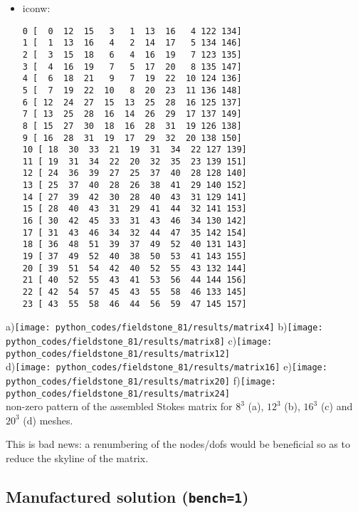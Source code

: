 \begin{itemize}
\item iconw:
\begin{verbatim}
0 [  0  12  15   3   1  13  16   4 122 134]
1 [  1  13  16   4   2  14  17   5 134 146]
2 [  3  15  18   6   4  16  19   7 123 135]
3 [  4  16  19   7   5  17  20   8 135 147]
4 [  6  18  21   9   7  19  22  10 124 136]
5 [  7  19  22  10   8  20  23  11 136 148]
6 [ 12  24  27  15  13  25  28  16 125 137]
7 [ 13  25  28  16  14  26  29  17 137 149]
8 [ 15  27  30  18  16  28  31  19 126 138]
9 [ 16  28  31  19  17  29  32  20 138 150]
10 [ 18  30  33  21  19  31  34  22 127 139]
11 [ 19  31  34  22  20  32  35  23 139 151]
12 [ 24  36  39  27  25  37  40  28 128 140]
13 [ 25  37  40  28  26  38  41  29 140 152]
14 [ 27  39  42  30  28  40  43  31 129 141]
15 [ 28  40  43  31  29  41  44  32 141 153]
16 [ 30  42  45  33  31  43  46  34 130 142]
17 [ 31  43  46  34  32  44  47  35 142 154]
18 [ 36  48  51  39  37  49  52  40 131 143]
19 [ 37  49  52  40  38  50  53  41 143 155]
20 [ 39  51  54  42  40  52  55  43 132 144]
21 [ 40  52  55  43  41  53  56  44 144 156]
22 [ 42  54  57  45  43  55  58  46 133 145]
23 [ 43  55  58  46  44  56  59  47 145 157]
\end{verbatim}

\end{itemize}


\begin{center}
a)\texttt{[image: python\_codes/fieldstone\_81/results/matrix4]}
b)\texttt{[image: python\_codes/fieldstone\_81/results/matrix8]}
c)\texttt{[image: python\_codes/fieldstone\_81/results/matrix12]}\\
d)\texttt{[image: python\_codes/fieldstone\_81/results/matrix16]}
e)\texttt{[image: python\_codes/fieldstone\_81/results/matrix20]}
f)\texttt{[image: python\_codes/fieldstone\_81/results/matrix24]}\\
{\captionfont non-zero pattern of the assembled Stokes matrix for $8^3$ (a), 
$12^3$ (b), $16^3$ (c) and $20^3$ (d) meshes.}
\end{center}
This is bad news: a renumbering of the nodes/dofs would be beneficial so as to reduce the 
skyline of the matrix. 

\subsection*{Manufactured solution ({\tt bench=1})}

